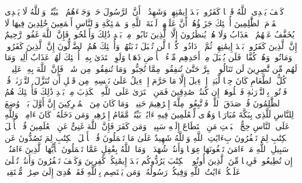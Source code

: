 \stopbuffer%
\startbuffer[\q:3:86]
كَیۡفَ یَهۡدِی ٱللَّهُ قَوۡمࣰا كَفَرُوا۟ بَعۡدَ إِیمَٰنِهِمۡ وَشَهِدُوۤا۟ أَنَّ ٱلرَّسُولَ حَقࣱّ وَجَاۤءَهُمُ ٱلۡبَیِّنَٰتُۚ وَٱللَّهُ لَا یَهۡدِی ٱلۡقَوۡمَ ٱلظَّٰلِمِینَ%
\stopbuffer%
\startbuffer[\q:3:87]
أُو۟لَٰۤئِكَ جَزَاۤؤُهُمۡ أَنَّ عَلَیۡهِمۡ لَعۡنَةَ ٱللَّهِ وَٱلۡمَلَٰۤئِكَةِ وَٱلنَّاسِ أَجۡمَعِینَ%
\stopbuffer%
\startbuffer[\q:3:88]
خَٰلِدِینَ فِیهَا لَا یُخَفَّفُ عَنۡهُمُ ٱلۡعَذَابُ وَلَا هُمۡ یُنظَرُونَ%
\stopbuffer%
\startbuffer[\q:3:89]
إِلَّا ٱلَّذِینَ تَابُوا۟ مِنۢ بَعۡدِ ذَٰلِكَ وَأَصۡلَحُوا۟ فَإِنَّ ٱللَّهَ غَفُورࣱ رَّحِیمٌ%
\stopbuffer%
\startbuffer[\q:3:90]
إِنَّ ٱلَّذِینَ كَفَرُوا۟ بَعۡدَ إِیمَٰنِهِمۡ ثُمَّ ٱزۡدَادُوا۟ كُفۡرࣰا لَّن تُقۡبَلَ تَوۡبَتُهُمۡ وَأُو۟لَٰۤئِكَ هُمُ ٱلضَّاۤلُّونَ%
\stopbuffer%
\startbuffer[\q:3:91]
إِنَّ ٱلَّذِینَ كَفَرُوا۟ وَمَاتُوا۟ وَهُمۡ كُفَّارࣱ فَلَن یُقۡبَلَ مِنۡ أَحَدِهِم مِّلۡءُ ٱلۡأَرۡضِ ذَهَبࣰا وَلَوِ ٱفۡتَدَىٰ بِهِۦۤۗ أُو۟لَٰۤئِكَ لَهُمۡ عَذَابٌ أَلِیمࣱ وَمَا لَهُم مِّن نَّٰصِرِینَ%
\stopbuffer%
\startbuffer[\q:3:92]
لَن تَنَالُوا۟ ٱلۡبِرَّ حَتَّىٰ تُنفِقُوا۟ مِمَّا تُحِبُّونَۚ وَمَا تُنفِقُوا۟ مِن شَیۡءࣲ فَإِنَّ ٱللَّهَ بِهِۦ عَلِیمࣱ%
\stopbuffer%
\startbuffer[\q:3:93]
۞ كُلُّ ٱلطَّعَامِ كَانَ حِلࣰّا لِّبَنِیۤ إِسۡرَٰۤءِیلَ إِلَّا مَا حَرَّمَ إِسۡرَٰۤءِیلُ عَلَىٰ نَفۡسِهِۦ مِن قَبۡلِ أَن تُنَزَّلَ ٱلتَّوۡرَىٰةُۚ قُلۡ فَأۡتُوا۟ بِٱلتَّوۡرَىٰةِ فَٱتۡلُوهَاۤ إِن كُنتُمۡ صَٰدِقِینَ%
\stopbuffer%
\startbuffer[\q:3:94]
فَمَنِ ٱفۡتَرَىٰ عَلَى ٱللَّهِ ٱلۡكَذِبَ مِنۢ بَعۡدِ ذَٰلِكَ فَأُو۟لَٰۤئِكَ هُمُ ٱلظَّٰلِمُونَ%
\stopbuffer%
\startbuffer[\q:3:95]
قُلۡ صَدَقَ ٱللَّهُۗ فَٱتَّبِعُوا۟ مِلَّةَ إِبۡرَٰهِیمَ حَنِیفࣰاۖ وَمَا كَانَ مِنَ ٱلۡمُشۡرِكِینَ%
\stopbuffer%
\startbuffer[\q:3:96]
إِنَّ أَوَّلَ بَیۡتࣲ وُضِعَ لِلنَّاسِ لَلَّذِی بِبَكَّةَ مُبَارَكࣰا وَهُدࣰى لِّلۡعَٰلَمِینَ%
\stopbuffer%
\startbuffer[\q:3:97]
فِیهِ ءَایَٰتُۢ بَیِّنَٰتࣱ مَّقَامُ إِبۡرَٰهِیمَۖ وَمَن دَخَلَهُۥ كَانَ ءَامِنࣰاۗ وَلِلَّهِ عَلَى ٱلنَّاسِ حِجُّ ٱلۡبَیۡتِ مَنِ ٱسۡتَطَاعَ إِلَیۡهِ سَبِیلࣰاۚ وَمَن كَفَرَ فَإِنَّ ٱللَّهَ غَنِیٌّ عَنِ ٱلۡعَٰلَمِینَ%
\stopbuffer%
\startbuffer[\q:3:98]
قُلۡ یَٰۤأَهۡلَ ٱلۡكِتَٰبِ لِمَ تَكۡفُرُونَ بِءَایَٰتِ ٱللَّهِ وَٱللَّهُ شَهِیدٌ عَلَىٰ مَا تَعۡمَلُونَ%
\stopbuffer%
\startbuffer[\q:3:99]
قُلۡ یَٰۤأَهۡلَ ٱلۡكِتَٰبِ لِمَ تَصُدُّونَ عَن سَبِیلِ ٱللَّهِ مَنۡ ءَامَنَ تَبۡغُونَهَا عِوَجࣰا وَأَنتُمۡ شُهَدَاۤءُۗ وَمَا ٱللَّهُ بِغَٰفِلٍ عَمَّا تَعۡمَلُونَ%
\stopbuffer%
\startbuffer[\q:3:100]
یَٰۤأَیُّهَا ٱلَّذِینَ ءَامَنُوۤا۟ إِن تُطِیعُوا۟ فَرِیقࣰا مِّنَ ٱلَّذِینَ أُوتُوا۟ ٱلۡكِتَٰبَ یَرُدُّوكُم بَعۡدَ إِیمَٰنِكُمۡ كَٰفِرِینَ%
\stopbuffer%
\startbuffer[\q:3:101]
وَكَیۡفَ تَكۡفُرُونَ وَأَنتُمۡ تُتۡلَىٰ عَلَیۡكُمۡ ءَایَٰتُ ٱللَّهِ وَفِیكُمۡ رَسُولُهُۥۗ وَمَن یَعۡتَصِم بِٱللَّهِ فَقَدۡ هُدِیَ إِلَىٰ صِرَٰطࣲ مُّسۡتَقِیمࣲ%
